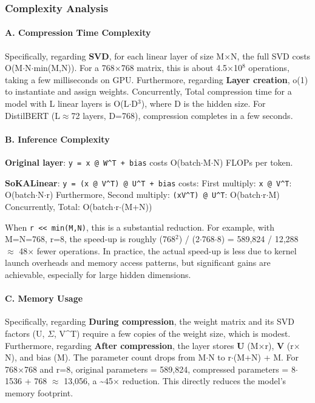 \subsubsection*{Complexity Analysis}

\paragraph{A. Compression Time Complexity}

Specifically, regarding \textbf{SVD}, for each linear layer of size M$\times$N, the full SVD costs O(M$\cdot$N$\cdot$min(M,N)). For a 768$\times$768 matrix, this is about 4.5$\times$10$^8$ operations, taking a few milliseconds on GPU. Furthermore, regarding \textbf{Layer creation}, o(1) to instantiate and assign weights. Concurrently, Total compression time for a model with L linear layers is O(L$\cdot$D$^3$), where D is the hidden size. For DistilBERT (L$\approx$72 layers, D=768), compression completes in a few seconds.


\paragraph{B. Inference Complexity}

\textbf{Original layer}: \texttt{y = x @ W\textasciicircum{}T + bias} costs O(batch$\cdot$M$\cdot$N) FLOPs per token.

\textbf{SoKALinear}: \texttt{y = (x @ V\textasciicircum{}T) @ U\textasciicircum{}T + bias} costs:
First multiply: \texttt{x @ V\textasciicircum{}T}: O(batch$\cdot$N$\cdot$r) Furthermore, Second multiply: \texttt{(xV\textasciicircum{}T) @ U\textasciicircum{}T}: O(batch$\cdot$r$\cdot$M) Concurrently, Total: O(batch$\cdot$r$\cdot$(M+N))


When \texttt{r << min(M,N)}, this is a substantial reduction. For example, with M=N=768, r=8, the speed-up is roughly (768$^2$) / (2$\cdot$768$\cdot$8) = 589,824 / 12,288 $\approx$ 48$\times$ fewer operations. In practice, the actual speed-up is less due to kernel launch overheads and memory access patterns, but significant gains are achievable, especially for large hidden dimensions.

\paragraph{C. Memory Usage}

Specifically, regarding \textbf{During compression}, the weight matrix and its SVD factors (U, $\Sigma$, V\textasciicircum{}T) require a few copies of the weight size, which is modest. Furthermore, regarding \textbf{After compression}, the layer stores \textbf{U} (M$\times$r), \textbf{V} (r$\times$N), and bias (M). The parameter count drops from M$\cdot$N to r$\cdot$(M+N) + M. For 768$\times$768 and r=8, original parameters = 589,824, compressed parameters = 8$\cdot$1536 + 768 $\approx$ 13,056, a \textasciitilde{}45$\times$ reduction. This directly reduces the model's memory footprint.



